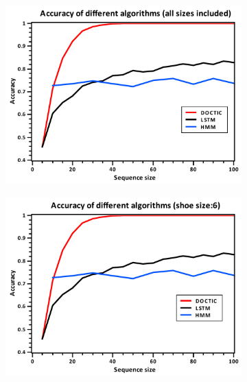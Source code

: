 \documentclass[review]{vgtc}                 %
\begin{document}
\begin{figure}[!htp]
	\centering	
	\begin{subfigure}{0.24\textwidth}
		\includegraphics[width=\linewidth]{figs/accuracy_all.pdf}
		\caption{}
		\label{fig:timecost_cumulative}
	\end{subfigure}
	\begin{subfigure}{0.24\textwidth}
		\includegraphics[width=\linewidth]{figs/accuracy_6.pdf}
		\caption{}
		\label{fig:accuracy_cumulative}
	\end{subfigure}
	\begin{subfigure}{0.24\textwidth}

\end{subfigure}
\end{figure}
\end{document}
